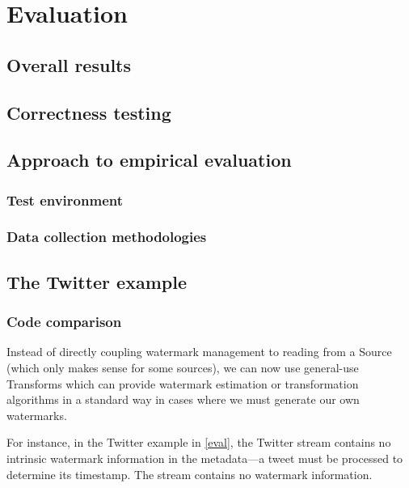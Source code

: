 \chapter{Evaluation}

\section{Overall results}


\section{Correctness testing}

\section{Approach to empirical evaluation}

\subsection{Test environment}

\subsection{Data collection methodologies}

\section{The Twitter example}

\subsection{Code comparison}



Instead of directly coupling watermark management to reading from a Source (which only makes sense for some sources), we can now use general-use Transforms which can provide watermark estimation or transformation algorithms in a standard way in cases where we must generate our own watermarks.

For instance, in the Twitter example in \cref{eval}, the Twitter stream contains no intrinsic watermark information in the metadata---a tweet must be processed to determine its timestamp.
The stream contains no watermark information.

